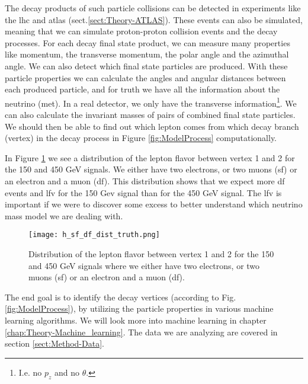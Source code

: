 \documentclass[a4paper, american, 12pt]{report}
\begin{document}
	The decay products of such particle collisions can be detected in experiments like the \acrshort{lhc} and \acrshort{atlas} (sect.\ref{sect:Theory-ATLAS}). These events can also be simulated, meaning that we can simulate proton-proton collision events and the decay processes. For each decay final state product, we can measure many properties like momentum, the transverse momentum, the polar angle and the azimuthal angle. We can also detect which final state particles are produced. With these particle properties we can calculate the angles and angular distances between each produced particle, and for truth we have all the information about the neutrino (\acrshort{met}). In a real detector, we only have the transverse information\footnote{I.e. no $p_z$ and no $\theta$.}. We can also calculate the invariant masses of pairs of combined final state particles. We should then be able to find out which lepton comes from which decay branch (vertex) in the decay process in Figure \ref{fig:ModelProcess} computationally.
	
	In Figure \ref{fig:LepFlavDist} we see a distribution of the lepton flavor between vertex 1 and 2 for the 150 and 450 GeV signals. We either have two electrons, or two muons (\acrshort{sf}) or an electron and a muon (\acrshort{df}). This distribution shows that we expect more \acrshort{df} events and \acrshort{lfv} for the 150 Gev signal than for the 450 GeV signal. The \acrshort{lfv} is important if we were to discover some excess to better understand which neutrino mass model we are dealing with.
	\begin{figure}[htbp!]
		\hspace*{-1.0cm}
		\centering\texttt{[image: h\_sf\_df\_dist\_truth.png]}
		\caption[Lepton flavor distribution between vertex 1 and 2.]{Distribution of the lepton flavor between vertex 1 and 2 for the 150 and 450 GeV signals where we either have two electrons, or two muons (\acrshort{sf}) or an electron and a muon (\acrshort{df}).  \label{fig:LepFlavDist}}
	\end{figure} 
	
	The end goal is to identify the decay vertices (according to Fig. \ref{fig:ModelProcess}), by utilizing the particle properties in various machine learning algorithms. We will look more into machine learning in chapter \ref{chap:Theory-Machine_learning}. The data we are analyzing are covered in section \ref{sect:Method-Data}.
	
	

\end{document}
